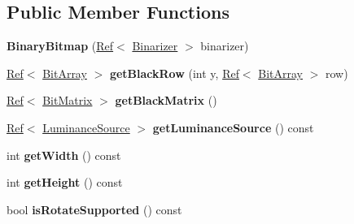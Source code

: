 \subsection*{Public Member Functions}
\begin{DoxyCompactItemize}
\item 
\mbox{\label{classzxing_1_1_binary_bitmap_adda10532f896a6d1a0a5d04161325f1e}} 
{\bfseries Binary\+Bitmap} (\mbox{\hyperlink{classzxing_1_1_ref}{Ref}}$<$ \mbox{\hyperlink{classzxing_1_1_binarizer}{Binarizer}} $>$ binarizer)
\item 
\mbox{\label{classzxing_1_1_binary_bitmap_a689b456759400f37335c0786c1fbea26}} 
\mbox{\hyperlink{classzxing_1_1_ref}{Ref}}$<$ \mbox{\hyperlink{classzxing_1_1_bit_array}{Bit\+Array}} $>$ {\bfseries get\+Black\+Row} (int y, \mbox{\hyperlink{classzxing_1_1_ref}{Ref}}$<$ \mbox{\hyperlink{classzxing_1_1_bit_array}{Bit\+Array}} $>$ row)
\item 
\mbox{\label{classzxing_1_1_binary_bitmap_a775cb57ead7c20efb909b829f61a42be}} 
\mbox{\hyperlink{classzxing_1_1_ref}{Ref}}$<$ \mbox{\hyperlink{classzxing_1_1_bit_matrix}{Bit\+Matrix}} $>$ {\bfseries get\+Black\+Matrix} ()
\item 
\mbox{\label{classzxing_1_1_binary_bitmap_a8d2fa263f92df79217fe9c6cd1bd8123}} 
\mbox{\hyperlink{classzxing_1_1_ref}{Ref}}$<$ \mbox{\hyperlink{classzxing_1_1_luminance_source}{Luminance\+Source}} $>$ {\bfseries get\+Luminance\+Source} () const
\item 
\mbox{\label{classzxing_1_1_binary_bitmap_a0596f676881549bce1697d7042502954}} 
int {\bfseries get\+Width} () const
\item 
\mbox{\label{classzxing_1_1_binary_bitmap_a0b622b389e73534ec8549d6fa9cf7f8c}} 
int {\bfseries get\+Height} () const
\item 
\mbox{\label{classzxing_1_1_binary_bitmap_a9da44fdffdcf9d07d50ad1ae9566a736}} 
bool {\bfseries is\+Rotate\+Supported} () const
\item 
\mbox{\label{classzxing_1_1_binary_bitmap_afb8cd2d2d8de6ddc1df146738b6745a6}} 

\end{DoxyCompactItemize}
